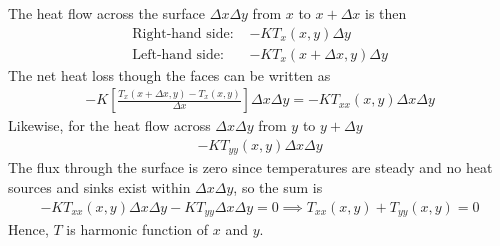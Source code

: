\documentclass[12pt, english]{book}
\begin{document}
	The heat flow across the surface \(\Delta x \Delta y\) from \(x\) to \(x + \Delta x\) is then 
	\begin{align*}
		\text{Right-hand side: }& -KT_x (x,y) \Delta y \\
		\text{Left-hand side: }& -KT_x (x+\Delta x,y) \Delta y
	\end{align*}
	The net heat loss though the faces can be written as  
	\begin{align*}
		-K \left[\frac{T_x (x + \Delta x, y) - T_x(x, y)}{\Delta x}\right] \Delta x \Delta y
		= -KT_{xx} (x,y) \Delta x \Delta y
	\end{align*}
	Likewise, for the heat flow across \(\Delta x \Delta y\) from \(y\) to \(y + \Delta y\)
	\begin{align*}
		-KT_{yy} (x,y) \Delta x \Delta y
	\end{align*}
	The flux through the surface is zero since temperatures are steady and no heat sources and sinks exist within \(\Delta x \Delta y\), so the sum is 
	\begin{align*}
		-KT_{xx} (x,y) \Delta x \Delta y - KT_{yy} \Delta x \Delta y = 0 
		\implies T_{xx} (x,y) + T_{yy} (x,y) = 0
	\end{align*}
	Hence, \(T\) is harmonic function of \(x\) and \(y\).
		\begin{figure}[H]
		\centering
		\end{figure}
\end{document}
